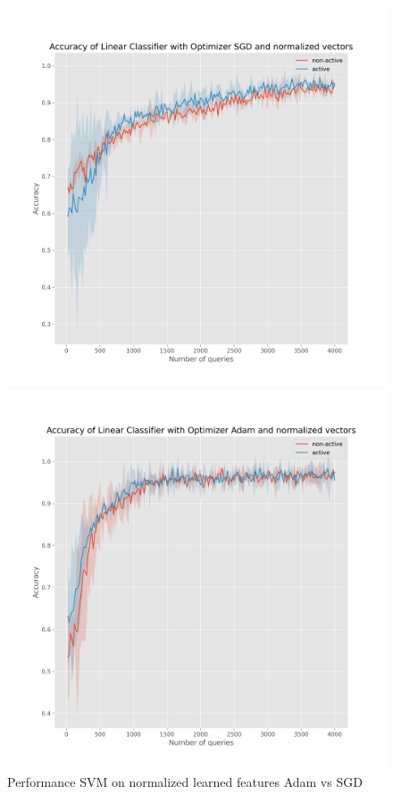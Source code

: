 \documentclass{article}
\begin{document}
\begin{figure}[!h]
  \centering
  \begin{minipage}{.45\textwidth}
    \centering
    \includegraphics[width=\linewidth]{active-vs-base-moons-linear-loss-SGD-normalized-ci}
  \end{minipage}%
  \begin{minipage}{.45\textwidth}
    \centering
    \includegraphics[width=\linewidth]{active-vs-base-moons-linear-loss-Adam-normalized-ci}
  \end{minipage}
  \caption{Performance SVM on normalized learned features Adam vs SGD}\label{fig:svm-normalized-ci}
\end{figure}
\end{document}
